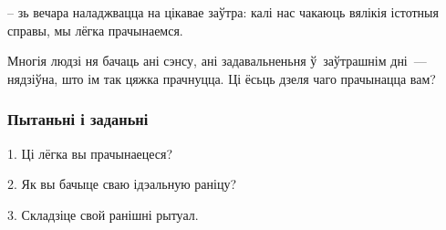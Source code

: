 – зь вечара наладжвацца на цікавае заўтра: калі нас чакаюць вялікія істотныя справы, мы лёгка прачынаемся.

Многія людзі ня бачаць ані сэнсу, ані задавальненьня ў~заўтрашнім дні~--- нядзіўна, што ім так цяжка прачнуцца. Ці ёсьць дзеля чаго прачынацца вам?

\subsubsection{Пытаньні і заданьні}

1. Ці лёгка вы прачынаецеся?

2. Як вы бачыце сваю ідэальную раніцу?

3. Складзіце свой ранішні рытуал.

